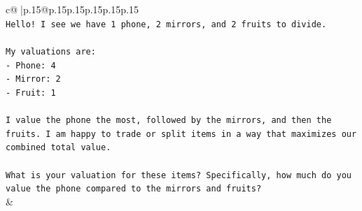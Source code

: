 \documentclass{article}
\begin{document}
{\begin{supertabular}{c@{$\;$}|p{.15\linewidth}@{}p{.15\linewidth}p{.15\linewidth}p{.15\linewidth}p{.15\linewidth}p{.15\linewidth}}
{{{\\ 
\texttt{Hello! I see we have 1 phone, 2 mirrors, and 2 fruits to divide.} \\
\\ 
\texttt{My valuations are:} \\
\texttt{{-} Phone: 4} \\
\texttt{{-} Mirror: 2} \\
\texttt{{-} Fruit: 1} \\
\\ 
\texttt{I value the phone the most, followed by the mirrors, and then the fruits. I am happy to trade or split items in a way that maximizes our combined total value.} \\
\\ 
\texttt{What is your valuation for these items? Specifically, how much do you value the phone compared to the mirrors and fruits?} \\
            }
        }
    }
    & \\ \\


\end{supertabular}}
\end{document}
